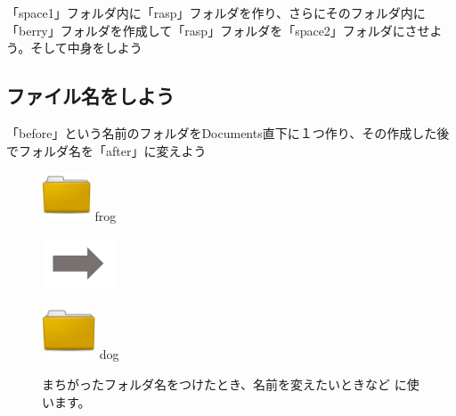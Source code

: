 \documentclass[a4paper,12pt]{jarticle}
\begin{document}
\theQuestion\label{Q:hasAnswer02-2}
「space1」フォルダ内に「rasp」フォルダを作り、さらにそのフォルダ内に「berry」フォルダを作成して「rasp」フォルダを「space2」フォルダにさせよう。そして中身をしよう



\clearpage
{}
\subsection{\theExercise ファイル名をしよう}
「before」という名前のフォルダをDocuments直下に１つ作り、その作成した後でフォルダ名を「after」に変えよう

\begin{figure}[ht]

  \centering
  \begin{minipage}{1.978cm}
    \includegraphics[width=1.45cm,height=1.45cm]{textbook-img044.png}
    frog
  \end{minipage}
  \includegraphics[width=2.168cm,height=1.542cm]{textbook-img052.png}
  \begin{minipage}{1.978cm}
    \includegraphics[width=1.588cm,height=1.588cm]{textbook-img044.png}
    dog
  \end{minipage}
  \begin{minipage}{6.319cm}
    まちがったフォルダ名をつけたとき、名前を変えたいときなど
    に使います。
  \end{minipage}


\end{figure}
\end{document}
